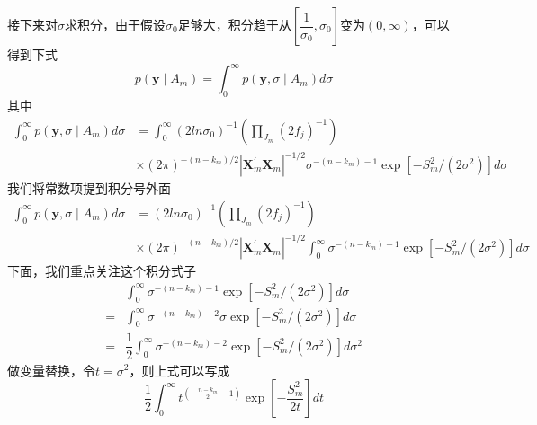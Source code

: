 \documentclass[12pt]{article} %
\begin{document}
	接下来对$\sigma$求积分，由于假设$\sigma_0$足够大，积分趋于从$[\dfrac{1}{\sigma_{0}}, \sigma_{0}]$变为$(0, \infty)$，可以得到下式
	\begin{equation*}
		p\left(\mathbf{y} \mid A_{m}\right)= \int_0^\infty p\left(\mathbf{y}, \sigma \mid A_{m}\right) d \sigma
	\end{equation*}
	其中
	\begin{equation}
		\begin{aligned}
			\int_0^\infty p\left(\mathbf{y}, \sigma \mid A_{m}\right) d \sigma &= \int_0^\infty  (2 ln\sigma_{0})^{-1} \left(\prod_{J_{m}}\left(2 f_{j}\right)^{-1}\right) \\
			&\times(2 \pi)^{-\left(n-k_{m}\right) / 2}\left|\mathbf{X}_{m}^{\prime} \mathbf{X}_{m}\right|^{-1 / 2} \sigma^{-\left(n-k_{m}  \right) -1} \exp \left[-S_{m}^{2} /\left(2 \sigma^{2}\right)\right]  d \sigma
			\label{E20}
		\end{aligned}
	\end{equation}
	我们将常数项提到积分号外面
	\begin{equation*}
		\begin{aligned}
			\int_0^\infty p\left(\mathbf{y}, \sigma \mid A_{m}\right) d \sigma &= (2 ln\sigma_{0})^{-1} \left(\prod_{J_{m}}\left(2 f_{j}\right)^{-1}\right) \\
			&\times(2 \pi)^{-\left(n-k_{m}\right) / 2}\left|\mathbf{X}_{m}^{\prime} \mathbf{X}_{m}\right|^{-1 / 2} \int_0^\infty  \sigma^{-\left(n-k_{m}  \right) -1} \exp \left[-S_{m}^{2} /\left(2 \sigma^{2}\right)\right] d \sigma
		\end{aligned}
	\end{equation*}
	下面，我们重点关注这个积分式子
	\begin{equation*}
		 \begin{aligned}
		 	&\int_0^\infty  \sigma^{-\left(n-k_{m}  \right) -1} \exp \left[-S_{m}^{2} /\left(2 \sigma^{2}\right)\right] d \sigma \\
		 	=& \int_0^\infty  \sigma^{-\left(n-k_{m}  \right) -2} \sigma \exp \left[-S_{m}^{2} /\left(2 \sigma^{2}\right)\right] d \sigma \\
		 	=& \dfrac{1}{2} \int_0^\infty  \sigma^{-\left(n-k_{m}  \right) -2}  \exp \left[-S_{m}^{2} /\left(2 \sigma^{2}\right)\right] d \sigma^2
		 \end{aligned}
	\end{equation*}
	做变量替换，令$t=\sigma^2$，则上式可以写成
	\begin{equation*}
		\frac{1}{2} \int_{0}^{\infty} t^{(-\frac{n-k_{m}}{2}-1)} \exp \left[-\frac{S_{m}^{2}}{2 t}\right] d t
	\end{equation*}
\end{document}
